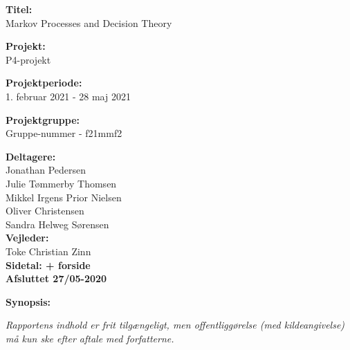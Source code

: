 \begin{minipage}[t]{0.48\textwidth}
\textbf{Titel:} \\[5pt]\hspace{2ex}
{Markov Processes and Decision Theory}
\bigskip

\textbf{Projekt:} \\[5pt]\hspace{2ex}
P4-projekt
\bigskip

\textbf{Projektperiode:} \\[5pt]\hspace{2ex}
1. februar 2021 - 28 maj 2021
\bigskip

\textbf{Projektgruppe:} \\[5pt]\hspace{2ex}
Gruppe-nummer - f21mmf2
\bigskip

\textbf{Deltagere:} \\[5pt]%
Jonathan Pedersen\\%
Julie Tømmerby Thomsen\\%
Mikkel Irgens Prior Nielsen \\%
Oliver Christensen\\%
Sandra Helweg Sørensen\\

\textbf{Vejleder:} \\[5pt]%
Toke Christian Zinn \\

\textbf{Sidetal: \pageref{LastPage} + forside} \\ 
\textbf{Afsluttet 27/05-2020}

\end{minipage}
\hfill
\begin{minipage}[t]{0.5\textwidth}
\textbf{Synopsis:} \\[5pt]
\end{minipage}
\hspace*{2ex}

\vfill

{\footnotesize \textit{Rapportens indhold er frit tilgængeligt, men offentliggørelse (med kildeangivelse) må kun ske efter aftale med forfatterne.}}

\pagebreak
\phantom{a}
\thispagestyle{empty}